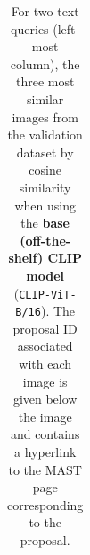 \documentclass{article} %
\begin{document}
\begin{table}[h!]
\begin{tabular}{m{2.7cm} p{2.9cm} p{2.9cm} p{2.9cm}}
         \bottomrule
     \end{tabular}
     \caption{For two text queries (left-most column), the three most similar images from the validation dataset by cosine similarity when using the \textbf{\textcolor{deeppurple}{base (off-the-shelf) CLIP model}} (\texttt{CLIP-ViT-B/16}). The proposal ID associated with each image is given below the image and contains a hyperlink to the MAST page corresponding to the proposal.}
     \label{tab:tti_base}
   \end{table}
   
\end{document}
